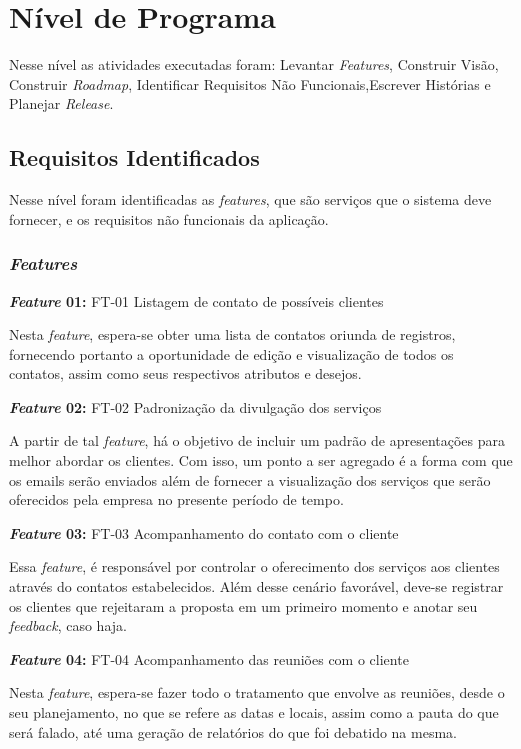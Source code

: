 \chapter[Nível de Programa]{Nível de Programa}
Nesse nível as atividades executadas foram: Levantar \textit{Features},
Construir Visão, Construir \textit{Roadmap}, Identificar Requisitos Não Funcionais,Escrever
Histórias e Planejar \textit{Release}. 

\section{Requisitos Identificados}

Nesse nível foram identificadas as \textit{features}, que são serviços que o sistema deve fornecer, e os requisitos não funcionais da aplicação.

\subsection{\textit{Features}}
\textbf{\textit{Feature} 01:} FT-01 Listagem de contato de possíveis clientes

Nesta \textit{feature}, espera-se obter uma lista de contatos oriunda de registros, fornecendo portanto a oportunidade de edição e visualização de todos os contatos, assim como seus respectivos atributos e desejos.


\textbf{\textit{Feature} 02:} FT-02 Padronização da divulgação dos serviços

A partir de tal \textit{feature}, há o objetivo de incluir um padrão de apresentações para melhor abordar os clientes. Com isso, um ponto a ser agregado é a forma com que os emails serão enviados além de fornecer a visualização dos serviços que serão oferecidos pela empresa no presente período de tempo.


\textbf{\textit{Feature} 03:} FT-03 Acompanhamento do contato com o cliente

Essa \textit{feature}, é responsável por controlar o oferecimento dos serviços aos clientes através do contatos estabelecidos. Além desse cenário favorável, deve-se registrar os clientes que rejeitaram a proposta em um primeiro momento e anotar seu \textit{feedback}, caso haja.


\textbf{\textit{Feature} 04:} FT-04 Acompanhamento das reuniões com o cliente

Nesta \textit{feature}, espera-se fazer todo o tratamento que envolve as reuniões, desde o seu planejamento, no que se refere as datas e locais, assim como a pauta do que será falado, até uma geração de relatórios do que foi debatido na mesma.		


